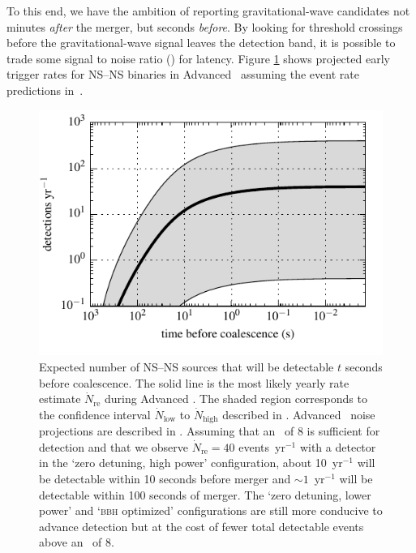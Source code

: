 To this end, we have the ambition of reporting gravitational-wave candidates not minutes
\emph{after} the merger, but seconds \emph{before}.  By
looking for threshold crossings before the gravitational-wave signal leaves
the detection band, it is possible to trade some signal to noise ratio (\SNR{})
for latency.  Figure \ref{fig:earlywarning} shows projected early trigger rates
for NS--NS binaries in Advanced \LIGO\ assuming the event rate predictions
in~\cite{Abadie:2010p10836}.
%
\begin{figure}
\begin{center}
\includegraphics{figures/snr_in_time.pdf}
\caption{\label{fig:earlywarning} Expected number of NS--NS sources that will
be detectable $t$ seconds before coalescence.  The solid line is the most
likely yearly rate estimate $\dot N_{\mathrm{re}}$ during Advanced \LIGO.  The
shaded region corresponds to the confidence interval $\dot N_{\mathrm{low}}$ to $\dot 
N_{\mathrm{high}}$ described in
\cite{Abadie:2010p10836}.  Advanced \LIGO\ noise projections are described in 
\cite{ALIGONoise}.  Assuming that an \SNR\ of 8 is sufficient for
detection and that we observe $\dot N_{\mathrm{re}} = 40$ events~yr$^{-1}$ with a
detector in the `zero detuning, high power' configuration, about 10~yr$^{-1}$ will be 
detectable within 10 seconds before merger and $\sim1$~yr$^{-1}$ will be detectable 
within 100 seconds of merger.  The `zero detuning, lower power' and `\textsc{bbh} optimized' configurations are still more conducive to advance detection
but at the cost of fewer total detectable events above an \SNR\ of 8.}
\end{center}
\end{figure}

